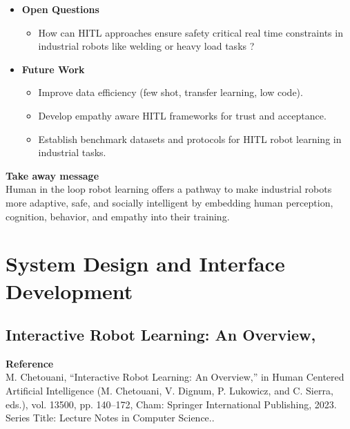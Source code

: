 \documentclass[report.tex]{subfiles}
\begin{document}
\begin{itemize}
    \item \noindent\textbf {Open Questions}
    \begin{itemize}
        \item    How can HITL approaches ensure safety critical real time constraints in industrial robots like welding or heavy load tasks ?

    \end{itemize}
    
    \item \noindent\textbf{Future Work}
    \begin{itemize}
        \item Improve data efficiency (few shot, transfer learning, low code).
        \item Develop empathy aware HITL frameworks for trust and acceptance.
        \item  Establish benchmark datasets and protocols for HITL robot learning in industrial tasks.
        
    \end{itemize}
\end{itemize}


\noindent\textbf{Take away message}  \\
Human in the loop robot learning offers a pathway to make industrial robots more adaptive, safe, and socially intelligent by embedding human perception, cognition, behavior, and empathy into their training. 























\section{System Design and Interface Development}

\subsection{Interactive Robot Learning: An Overview,} 

\noindent\textbf{Reference} \\
\cite{chetouani_interactive_2023}  M. Chetouani, “Interactive Robot Learning: An Overview,” in Human Centered Artificial Intelligence (M. Chetouani, V. Dignum, P. Lukowicz, and C. Sierra, eds.), vol. 13500, pp. 140–172, Cham: Springer International Publishing, 2023. Series Title: Lecture Notes in Computer Science..  \\
\end{document}
